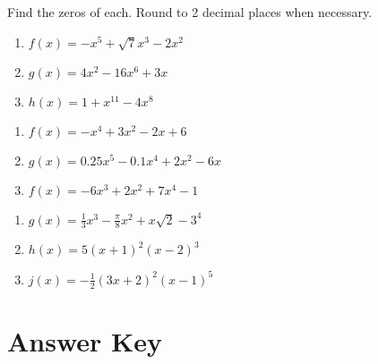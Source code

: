 Find the zeros of each. Round to 2 decimal places when necessary.
\begin{multicols}{3}
\begin{enumerate}	\setcounter{enumi}{\value{Review}}
\item $f(x) = -x^5 + \sqrt{7}x^3 - 2x^2$
\item $g(x) = 4x^2 - 16x^6 + 3x$
\item $h(x) = 1 + x^{11} - 4x^8$
\end{enumerate}	\setcounter{Review}{\value{enumi}}
\end{multicols}
\begin{multicols}{3}
\begin{enumerate}	\setcounter{enumi}{\value{Review}} 
\item $f(x) = -x^4+3x^2-2x+6$
\item $g(x) = 0.25x^5-0.1x^4+2x^2-6x$
\item $f(x) = -6x^3 + 2x^2 + 7x^4 - 1$
\end{enumerate}	\setcounter{Review}{\value{enumi}}
\end{multicols}
\begin{multicols}{3}
\begin{enumerate}	\setcounter{enumi}{\value{Review}} 
\item $g(x) = \frac{1}{3}x^3 - \frac{\pi}{8}x^2 + x\sqrt{2} - 3^4$
\item $h(x) = 5(x+1)^2(x-2)^3$
\item $j(x) = -\frac{1}{2}\left(3x+2\right)^2(x-1)^5$
\end{enumerate}	\setcounter{Review}{\value{enumi}}
\end{multicols}

\newpage

\section{Answer Key}

